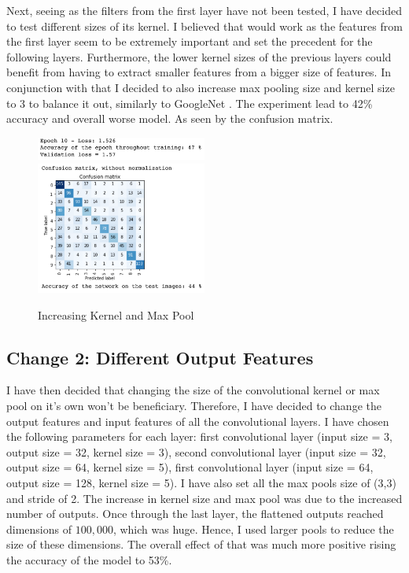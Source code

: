 \documentclass{article}
\begin{document}
    Next, seeing as the filters from the first layer have not been tested, I have decided to test different sizes of its kernel. I believed that would work as the features from the first layer seem to be extremely important and set the precedent for the following layers. Furthermore, the lower kernel sizes of the previous layers could benefit from having to extract smaller features from a bigger size of features. In conjunction with that I decided to also increase max pooling size and kernel size to 3 to balance it out, similarly to GoogleNet \cite{googlenet}. The experiment lead to 42\% accuracy and overall worse model. As seen by the confusion matrix.\\

    \begin{figure}[h!]
        \centering
        \includegraphics[width=0.5\textwidth]{7ks_3mp_train}
        \includegraphics[width=0.5\textwidth]{7ks_3mp}
        \caption{Increasing Kernel and Max Pool}
    \end{figure}

    \subsection{Change 2: Different Output Features}

    I have then decided that changing the size of the convolutional kernel or max pool on it's own won't be beneficiary. Therefore, I have decided to change the output features and input features of all the convolutional layers. I have chosen the following parameters for each layer: first convolutional layer (input size = 3, output size = 32, kernel size = 3), second convolutional layer (input size = 32, output size = 64, kernel size = 5), first convolutional layer (input size = 64, output size = 128, kernel size = 5). I have also set all the max pools size of (3,3) and stride of 2. The increase in kernel size and max pool was due to the increased number of outputs. Once through the last layer, the flattened outputs reached dimensions of $100,000$, which was huge. Hence, I used larger pools to reduce the size of these dimensions. The overall effect of that was much more positive rising the accuracy of the model to 53\%.
\end{document}
